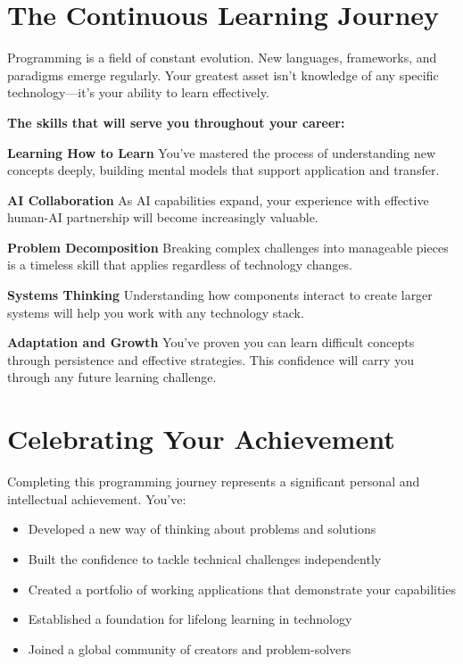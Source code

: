 \documentclass[
  letterpaper,
  DIV=11,
  numbers=noendperiod,
  oneside]{scrreprt}
\providecommand{\tightlist}{%
  \setlength{\itemsep}{0pt}\setlength{\parskip}{0pt}}\usepackage{longtable,booktabs,array}
\begin{document}
\section{The Continuous Learning
Journey}\label{the-continuous-learning-journey}

Programming is a field of constant evolution. New languages, frameworks,
and paradigms emerge regularly. Your greatest asset isn't knowledge of
any specific technology---it's your ability to learn effectively.

\textbf{The skills that will serve you throughout your career:}

\textbf{Learning How to Learn} You've mastered the process of
understanding new concepts deeply, building mental models that support
application and transfer.

\textbf{AI Collaboration} As AI capabilities expand, your experience
with effective human-AI partnership will become increasingly valuable.

\textbf{Problem Decomposition} Breaking complex challenges into
manageable pieces is a timeless skill that applies regardless of
technology changes.

\textbf{Systems Thinking} Understanding how components interact to
create larger systems will help you work with any technology stack.

\textbf{Adaptation and Growth} You've proven you can learn difficult
concepts through persistence and effective strategies. This confidence
will carry you through any future learning challenge.

\section{Celebrating Your
Achievement}\label{celebrating-your-achievement-1}

Completing this programming journey represents a significant personal
and intellectual achievement. You've:

\begin{itemize}
\tightlist
\item
  Developed a new way of thinking about problems and solutions
\item
  Built the confidence to tackle technical challenges independently
\item
  Created a portfolio of working applications that demonstrate your
  capabilities
\item
  Established a foundation for lifelong learning in technology
\item
  Joined a global community of creators and problem-solvers
\end{itemize}
\end{document}
